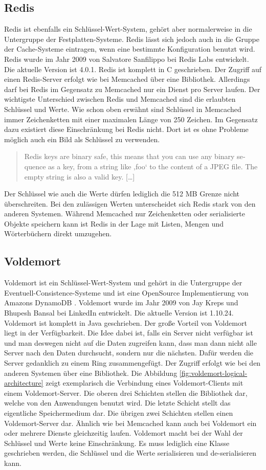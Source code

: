 \subsection{Redis}
Redis ist ebenfalls ein Schlüssel-Wert-System, gehört aber normalerweise in die
Untergruppe der Festplatten-Systeme. Redis lässt sich jedoch auch in die Gruppe
der Cache-Systeme eintragen, wenn eine bestimmte Konfiguration benutzt wird.
Redis wurde im Jahr 2009 von Salvatore Sanfilippo bei Redis Labs entwickelt.
Die aktuelle Version ist 4.0.1. Redis ist komplett in C geschrieben.
Der Zugriff auf einen Redis-Server erfolgt wie bei Memcached über eine Bibliothek.
Allerdings darf bei Redis im Gegensatz zu Memcached nur ein Dienst pro Server
laufen. Der wichtigste Unterschied zwischen Redis und Memcached sind die
erlaubten Schlüssel und Werte. Wie schon oben erwähnt sind Schlüssel in Memcached
immer Zeichenketten mit einer maximalen Länge von 250 Zeichen. Im Gegensatz dazu
existiert diese Einschränkung bei Redis nicht. Dort ist es ohne Probleme möglich
auch ein Bild als Schlüssel zu verwenden.

\foreignblockquote{english}[\cite{Redis2010}]{Redis keys are binary safe, this
means that you can use any binary sequence as a key, from a string like ‚foo‘
to the content of a JPEG file. The empty string is also a valid key. [\dots]}

Der Schlüssel wie auch die Werte dürfen lediglich die 512 MB Grenze nicht
überschreiten. Bei den zulässigen Werten unterscheidet sich Redis stark von den
anderen Systemen. Während Memcached nur Zeichenketten oder serialisierte Objekte
speichern kann ist Redis in der Lage mit Listen, Mengen und Wörterbüchern direkt
umzugehen.

\subsection{Voldemort}
Voldemort ist ein Schlüssel-Wert-System und gehört in die Untergruppe der
Eventuell-Consistence-Systeme und ist eine OpenSource Implementierung von
Amazons DynamoDB \cite{DeCandia2007}. Voldemort wurde im Jahr 2009 von Jay Kreps
und Bhupesh Bansal bei LinkedIn entwickelt. Die aktuelle Version ist 1.10.24.
Voldemort ist komplett in Java geschrieben. Der große Vorteil von Voldemort
liegt in der Verfügbarkeit. Die Idee dabei ist, falls ein Server nicht verfügbar
ist und man deswegen nicht auf die Daten zugreifen kann, dass man dann nicht
alle Server nach den Daten durchsucht, sondern nur die nächsten. Dafür werden die
Server gedanklich zu einem Ring zusammengefügt. Der Zugriff erfolgt wie bei den
anderen Systemen über eine Bibliothek. Die Abbildung \ref{fig:voldemort-logical-architecture}
zeigt exemplarisch die Verbindung eines Voldemort-Clients mit einem
Voldemort-Server. Die oberen drei Schichten stellen die Bibliothek dar, welche
von den Anwendungen benutzt wird. Die letzte Schicht stellt das eigentliche
Speichermedium dar. Die übrigen zwei Schichten stellen einen Voldemort-Server
dar. Ähnlich wie bei Memcached kann auch bei Voldemort ein oder mehrere Dienste
gleichzeitig laufen. Voldemort macht bei der Wahl der Schlüssel
und Werte keine Einschränkung. Es muss lediglich eine Klasse geschrieben werden,
die Schlüssel und die Werte serialisieren und de-serialisieren kann.

